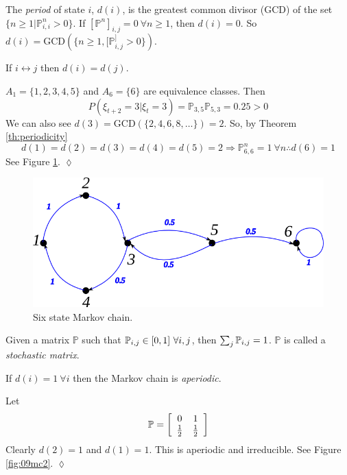 \documentclass[lecture,12pt,]{pcms-l}
\begin{document}
\begin{definition}
The \textit{period} of state $i$, $d(i)$, is the greatest common divisor (GCD) of the set $\{n\geq1|\mathbb{P}_{i,i}^n>0\}$. If $[\mathbb{P}^n]_{i,j} = 0 ~\forall n\geq1$, then $d(i)=0$. So $d(i) = \text{GCD}(\{n\geq1,[\mathbb{P}^]_{i,j}>0\})$.
\end{definition}

\begin{theorem}
\label{th:periodicity}
If $i\leftrightarrow j$ then $d(i)=d(j)$.
\end{theorem}

\begin{example}
$A_1=\{1,2,3,4,5\}$ and $A_6=\{6\}$ are equivalence classes. Then
$$P(\xi_{t+2}=3|\xi_t=3) = \mathbb{P}_{3,5}\mathbb{P}_{5,3} = 0.25> 0$$
We can also see $d(3)=\text{GCD}(\{2,4,6,8,\ldots\})=2$. So, by Theorem \ref{th:periodicity}
$$d(1)=d(2)=d(3)=d(4)=d(5)=2 \Rightarrow \mathbb{P}_{6,6}^n=1 ~\forall n \therefore d(6)=1$$
See Figure \ref{fig:09mc6}.
$\lozenge$
\end{example}

\begin{figure}[ht!]
	\centering
	\includegraphics[width=.4\textwidth]{images/09mc6}
	\caption{Six state Markov chain.}
	\label{fig:09mc6}
\end{figure}

\begin{definition}
Given a matrix $\mathbb{P}$ such that $\mathbb{P}_{i,j}\in[0,1] ~\forall i,j$, then $\sum_j\mathbb{P}_{i,j}=1$. $\mathbb{P}$ is called a \textit{stochastic matrix}.
\end{definition}

\begin{definition}
If $d(i)=1 ~\forall i$ then the Markov chain is \textit{aperiodic}.
\end{definition}

\begin{example}
Let
$$\mathbb{P} = \left[\begin{array}{c c} 0 & 1 \\ \frac{1}{2} & \frac{1}{2} \end{array}\right]$$
Clearly $d(2)=1$ and $d(1)=1$. This is aperiodic and irreducible. See Figure \ref{fig:09mc2}.
$\lozenge$
\end{example}
\end{document}
